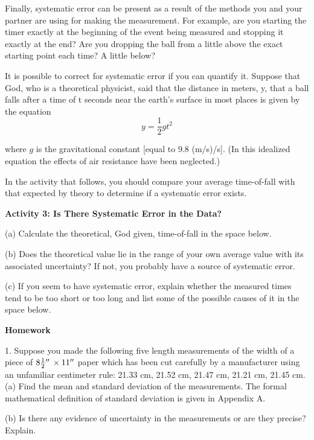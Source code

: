 Finally, systematic error can be present as a result of the methods you and
your partner are using for making the measurement. For example, are you starting
the timer exactly at the beginning of the event being measured and stopping
it exactly at the end? Are you dropping the ball from a little above the exact
starting point each time? A little below?

It is possible to correct for systematic error if you can quantify it. Suppose
that God, who is a theoretical physicist, said that the distance in meters,
y, that a ball falls after a time of t seconds near the earth's surface in most
places is given by the equation
\[
y=\frac{1}{2}gt^{2}\]


where $g$ is the gravitational constant [equal to 9.8 (m/s)/s]. (In this idealized
equation the effects of air resistance have been neglected.)

In the activity that follows, you should compare your average time-of-fall with that expected by theory to determine if a systematic error exists. 

\textbf{Activity 3: Is There Systematic Error in the Data? }

(a) Calculate the theoretical, God given, time-of-fall in the space below.
\vspace{20mm}

(b) Does the theoretical value lie in the range of your own average value with
its associated uncertainty? If not, you probably have a source of systematic
error.
\vspace{20mm}

(c) If you seem to have systematic error, explain whether the measured times
tend to be too short or too long and list some of the possible causes of it
in the space below.
\vspace{30mm}

\newpage

\textbf{Homework} 

1. Suppose you made the following five length measurements of the width of a
piece of $8{1\over2} {}''\, \times 11''$ paper which has been cut carefully by
a manufacturer using an unfamiliar centimeter rule: 21.33 cm, 21.52 cm, 21.47
cm, 21.21 cm, 21.45 cm. (a) Find the mean and standard deviation of the measurements.
The formal mathematical definition of standard deviation 
is given in Appendix A. 
\vspace{30mm}

(b) Is there any evidence of uncertainty in the measurements or are they precise?
Explain. 
\vspace{20mm}

